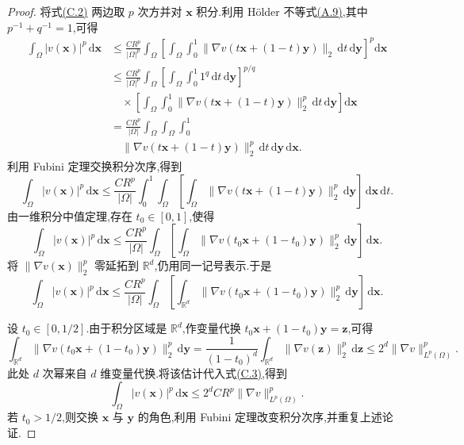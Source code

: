 \begin{proof}
将式\hyperref[eq:appendix-c-2]{(C.2)} 两边取 $p$ 次方并对 $\bm x$ 积分.利用 Hölder 不等式\hyperref[eq:appendix-a-9]{(A.9)},其中 $p^{-1}+q^{-1}=1$,可得
\[
\begin{aligned}
 \int_\Omega|v(\bm x)|^p\,\mathrm d\bm x
 &\le\frac{CR^p}{|\Omega|^p}
 \int_\Omega\left[
   \int_\Omega\int_0^1
    \|\nabla v(t\bm x+(1-t)\bm y)\|_2
    \,\mathrm dt\,\mathrm d\bm y
 \right]^p\mathrm d\bm x\\
 &\le\frac{CR^p}{|\Omega|^p}
 \int_\Omega
  \left[\int_\Omega\int_0^1 1^q\,\mathrm dt\,\mathrm d\bm y\right]^{p/q}
  \\
  &\quad\times\left[\int_\Omega\int_0^1
   \|\nabla v(t\bm x+(1-t)\bm y)\|_2^p
   \,\mathrm dt\,\mathrm d\bm y\right]\mathrm d\bm x\\
 &=\frac{CR^p}{|\Omega|}
  \int_\Omega\int_\Omega\int_0^1\\
  &\quad\|\nabla v(t\bm x+(1-t)\bm y)\|_2^p
   \,\mathrm dt\,\mathrm d\bm y\,\mathrm d\bm x.
\end{aligned}
\]
利用 Fubini 定理交换积分次序,得到
\[
 \int_\Omega|v(\bm x)|^p\,\mathrm d\bm x
 \le\frac{CR^p}{|\Omega|}\int_0^1\int_\Omega
   \left[\int_\Omega
    \|\nabla v(t\bm x+(1-t)\bm y)\|_2^p
    \,\mathrm d\bm y\right]
   \,\mathrm d\bm x\,\mathrm dt.
\]
由一维积分中值定理,存在 $t_0\in[0,1]$,使得
\[
 \int_\Omega|v(\bm x)|^p\,\mathrm d\bm x
 \le\frac{CR^p}{|\Omega|}\int_\Omega
   \left[\int_\Omega
    \|\nabla v(t_0\bm x+(1-t_0)\bm y)\|_2^p
    \,\mathrm d\bm y\right]
   \,\mathrm d\bm x.
\]
将 $\|\nabla v(\bm x)\|_2^p$ 零延拓到 $\mathbb R^d$,仍用同一记号表示.于是
\begin{equation}\label{eq:appendix-c-3}
 \int_\Omega|v(\bm x)|^p\,\mathrm d\bm x
 \le\frac{CR^p}{|\Omega|}\int_\Omega
   \left[\int_{\mathbb R^d}
    \|\nabla v(t_0\bm x+(1-t_0)\bm y)\|_2^p
    \,\mathrm d\bm y\right]
   \,\mathrm d\bm x.
\end{equation}

设 $t_0\in[0,1/2]$.由于积分区域是 $\mathbb R^d$,作变量代换
$t_0\bm x+(1-t_0)\bm y=\bm z$,可得
\[
 \int_{\mathbb R^d}
   \|\nabla v(t_0\bm x+(1-t_0)\bm y)\|_2^p\,\mathrm d\bm y
 =\frac1{(1-t_0)^d}\int_{\mathbb R^d}\|\nabla v(\bm z)\|_2^p\,\mathrm d\bm z
 \le2^d\|\nabla v\|_{L^p(\Omega)}^p.
\]
此处 $d$ 次幂来自 $d$ 维变量代换.将该估计代入式\hyperref[eq:appendix-c-3]{(C.3)},得到
\[
 \int_\Omega|v(\bm x)|^p\,\mathrm d\bm x
 \le2^dCR^p\|\nabla v\|_{L^p(\Omega)}^p.
\]
若 $t_0>1/2$,则交换 $\bm x$ 与 $\bm y$ 的角色,利用 Fubini 定理改变积分次序,并重复上述论证.
\end{proof}

